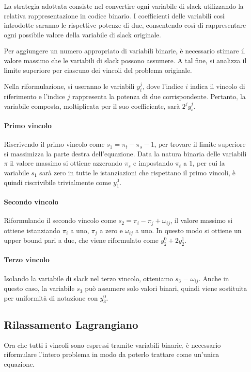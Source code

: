 \documentclass{article}
\begin{document}
La strategia adottata consiste nel convertire ogni variabile di slack utilizzando la relativa rappresentazione in codice binario. I coefficienti delle variabili così introdotte saranno le rispettive potenze di due, consentendo così di rappresentare ogni possibile valore della variabile di slack originale.

Per aggiungere un numero appropriato di variabili binarie, è necessario stimare il valore massimo che le variabili di slack possono assumere. A tal fine, si analizza il limite superiore per ciascuno dei vincoli del problema originale.

Nella riformulazione, si useranno le variabili $y_i^j$, dove l'indice $i$ indica il vincolo di riferimento e l'indice $j$ rappresenta la potenza di due corrispondente. Pertanto, la variabile composta, moltiplicata per il suo coefficiente, sarà $2^jy_i^j$.

\paragraph{Primo vincolo} Riscrivendo il primo vincolo come $s_1 = \pi_t - \pi_s - 1$, per trovare il limite superiore si massimizza la parte destra dell'equazione. Data la natura binaria delle variabili $\pi$ il valore massimo si ottiene azzerando $\pi_s$ e impostando $\pi_t$ a 1, per cui la variabile $s_1$ sarà zero in tutte le istanziazioni che rispettano il primo vincoli, è quindi riscrivibile trivialmente come $y_1^0$. 

\paragraph{Secondo vincolo} Riformulando il secondo vincolo come $s_2 = \pi_i - \pi_j + \omega_{ij}$, il valore massimo si ottiene istanziando $\pi_i$ a uno, $\pi_j$ a zero e $\omega_{ij}$ a uno. In questo modo si ottiene un upper bound pari a due, che viene riformulato come $y_2^0 + 2y_2^1$.

\paragraph{Terzo vincolo} Isolando la variabile di slack nel terzo vincolo, otteniamo $s_3 = \omega_{ij}$. Anche in questo caso, la variabile $s_3$ può assumere solo valori binari, quindi viene sostituita per uniformità di notazione con $y_3^0$.

\subsection{Rilassamento Lagrangiano}
Ora che tutti i vincoli sono espressi tramite variabili binarie, è necessario riformulare l'intero problema in modo da poterlo trattare come un'unica equazione.
\end{document}

